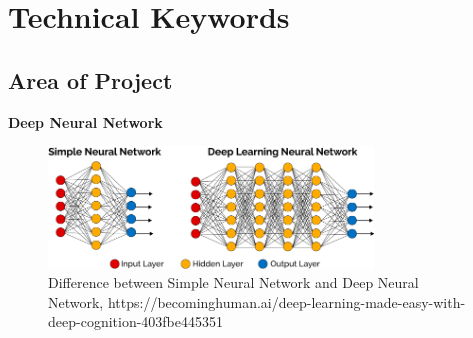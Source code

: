 \documentclass[11pt,fleqn]{book} %
\begin{document}



\chapter{Technical Keywords}

\section{Area of Project}
\textbf{\color{ocre}Deep Neural Network}
\begin{figure}[h]
    \centering
    \includegraphics[width=0.77\textwidth]{Pictures/dnn.png}
    \caption{Difference between Simple Neural Network and Deep Neural Network, https://becominghuman.ai/deep-learning-made-easy-with-deep-cognition-403fbe445351}
    \label{fig:awesome_image}
\end{figure}

\end{document}
